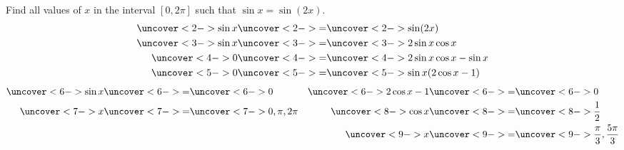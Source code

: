 \begin{frame}
\begin{example}
Find all values of $x$ in the interval $[0, 2\pi ]$ such that $\sin x = \sin (2x) $.
\abovedisplayskip=0pt
\belowdisplayskip=0pt
\abovedisplayshortskip=0pt
\belowdisplayshortskip=0pt
\begin{align*}
\uncover<2->{\sin x} & \uncover<2->{=}  \uncover<2->{\sin (2x)}\\
\uncover<3->{\sin x} & \uncover<3->{=}  \uncover<3->{2\sin x \cos x}\\
\uncover<4->{0} & \uncover<4->{=}  \uncover<4->{2\sin x \cos x - \sin x}\\
\uncover<5->{0} & \uncover<5->{=}  \uncover<5->{\sin x (2 \cos x - 1)}
\end{align*}
\abovedisplayskip=0pt
\belowdisplayskip=0pt
\abovedisplayshortskip=0pt
\belowdisplayshortskip=0pt
\begin{align*}
\uncover<6->{\sin x} & \uncover<6->{=}  \uncover<6->{0} & \uncover<6->{ 2\cos x - 1} & \uncover<6->{=}  \uncover<6->{0}\\
\uncover<7->{ x} & \uncover<7->{=}  \uncover<7->{0, \pi , 2\pi} & \uncover<8->{\cos x} & \uncover<8->{=}  \uncover<8->{\frac{1}{2}}\\
& & \uncover<9->{ x} & \uncover<9->{=}  \uncover<9->{\frac{\pi}{3}, \frac{5\pi}{3}}
\end{align*}
\end{example}
\end{frame}
